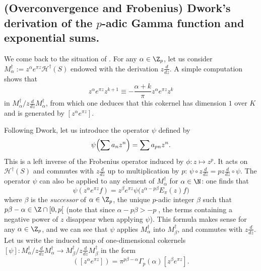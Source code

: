 \subsection{(Overconvergence and Frobenius) Dwork's derivation of
the $p$-adic Gamma function and exponential sums.}
\label{subsection-deriv-of-gamma}

\begin{para}
 We come back to the situation of
 .  For any $\alpha \in {\Z}_p$, let us consider
 $M_{\alpha}^{\dagger}:= z^{\alpha}e^{\pi z}\mathcal{H}^{\dagger}(S)$
 endowed with the derivation $z\frac{d}{dz}$. A simple computation shows
 that
 \begin{equation*}
  z^{\alpha}e^{\pi z}z^{k+1}\equiv
   -\frac{\alpha + k}{\pi}z^{\alpha}e^{\pi z}z^k 
 \end{equation*}
 in $M_{\alpha}^{\dagger}/z\frac{d}{dz}M_{\alpha}^{\dagger}$, from which
 one deduces that this cokernel has dimension $1$ over $K$ and is
 generated by $[z^{\alpha}e^{\pi z}]$.

 Following Dwork, let us introduce the operator $\psi$ defined by
 \begin{equation*}
  \psi\Bigl(\sum a_nz^n\Bigr)=\sum a_{pn}z^n.
 \end{equation*}
 This is a left inverse of the Frobenius operator induced by
 $\phi: z \mapsto z^p$.  It acts on $\mathcal{H}^{\dagger}(S)$ and
 commutes with $z\frac{d}{dz}$ up to multiplication by
 $p$: $\psi \circ z\frac{d}{dz}= pz\frac{d}{dz} \circ \psi$.
 The operator $\psi$ can also be applied to any element of
 $M_{\alpha}^{\dagger}$ for $\alpha \in \N$: one finds that
 \begin{equation*}
  \psi(z^{\alpha}e^{\pi z}f)=z^{\beta}e^{\pi z}\psi\bigl(z^{\alpha -
   p\beta}E_{\pi}(z)f\bigr) 
 \end{equation*}
 where $\beta$ is the {\it successor} of $\alpha \in {\Z}_p$, \ie  the
 unique $p$-adic integer $\beta$ such that $p\beta - \alpha \in {\Z}\cap
 [0,p[$ (note that since $\alpha - p\beta >-p\;$, the terms containing a
 negative power of $z$ disappear when applying $\psi$). This formula
 makes sense for any $\alpha \in {\Z}_p$, and we can see that $\psi$
 applies $M_{\alpha}^{\dagger}$ into $M_{\beta}^{\dagger}$, and commutes
 with $z\frac{d}{dz}$. Let us write the induced map of one-dimensional
 cokernels $[{\psi}]:M_{\alpha}^{\dagger} /
 z\frac{d}{dz}M_{\alpha}^{\dagger}\rightarrow
 M_{\beta}^{\dagger}/z\frac{d}{dz}M_{\beta}^{\dagger}$ in the form
 \begin{equation*}
  [{\psi}]([z^{\alpha}e^{\pi z}]) = 
   {\pi}^{p\beta  - \alpha}\Gamma_p(\alpha)[z^{\beta}e^{\pi z}].
 \end{equation*}
\end{para}

